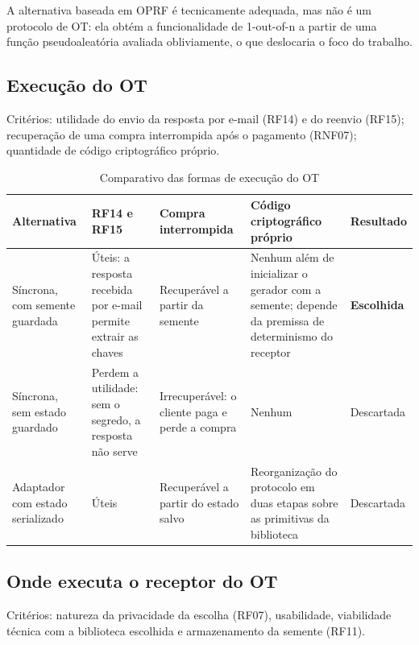 \documentclass[12pt, oneside, a4paper, english, brazil]{abntex2}
\begin{document}
A alternativa baseada em OPRF é tecnicamente adequada, mas não é um protocolo
de OT: ela obtém a funcionalidade de 1-out-of-n a partir de uma função
pseudoaleatória avaliada obliviamente, o que deslocaria o foco do trabalho.

\subsection{Execução do OT}

Critérios: utilidade do envio da resposta por e-mail (RF14) e do reenvio
(RF15); recuperação de uma compra interrompida após o pagamento (RNF07);
quantidade de código criptográfico próprio.

\begin{table}[H]
\centering
\caption{Comparativo das formas de execução do OT}\label{tab:comp-execucao}
\footnotesize
\renewcommand{\arraystretch}{1.25}
\begin{tabularx}{\textwidth}{@{}>{\raggedright\arraybackslash}p{}
  >{\raggedright\arraybackslash}X >{\raggedright\arraybackslash}X
  >{\raggedright\arraybackslash}X >{\raggedright\arraybackslash}p{}@{}}
\toprule
\textbf{Alternativa} & \textbf{RF14 e RF15} & \textbf{Compra interrompida} &
\textbf{Código criptográfico próprio} & \textbf{Resultado} \\
\midrule
Síncrona, com semente guardada &
Úteis: a resposta recebida por e-mail permite extrair as chaves &
Recuperável a partir da semente &
Nenhum além de inicializar o gerador com a semente; depende da premissa de
determinismo do receptor &
\textbf{Escolhida} \\
\addlinespace
Síncrona, sem estado guardado &
Perdem a utilidade: sem o segredo, a resposta não serve &
Irrecuperável: o cliente paga e perde a compra &
Nenhum &
Descartada \\
\addlinespace
Adaptador com estado serializado &
Úteis &
Recuperável a partir do estado salvo &
Reorganização do protocolo em duas etapas sobre as primitivas da biblioteca &
Descartada \\
\bottomrule
\end{tabularx}
\end{table}

\subsection{Onde executa o receptor do OT}

Critérios: natureza da privacidade da escolha (RF07), usabilidade, viabilidade
técnica com a biblioteca escolhida e armazenamento da semente (RF11).
\end{document}
